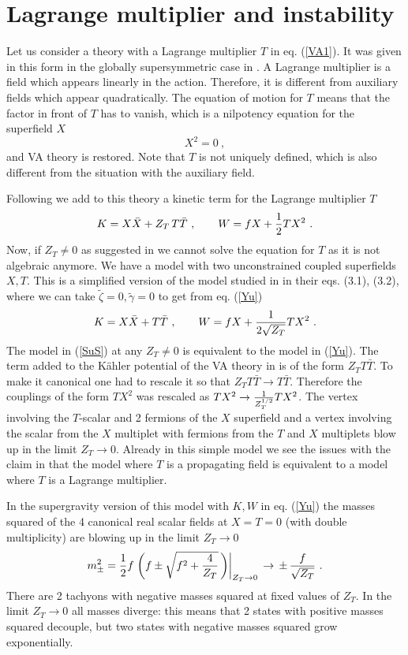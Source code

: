 \documentclass[11pt]{article}
\newcommand{\be}{\begin{equation}}
\newcommand{\ee}{\end{equation}}
\def\K{K{\"a}hler }
\newcommand{\rf}[1]{(\ref{#1})}
\def\be{\begin{equation}}
\def\ee{\end{equation}}
\newcommand{\lp}{\left(}
\newcommand{\rp}{\right)}
\begin{document}
\section{Lagrange multiplier and instability}\label{sec: LM}

Let us consider a theory with a Lagrange multiplier $T$ in  eq. \rf{VA1}. It was given in this form in the globally supersymmetric case in \cite{Komargodski:2009rz}. A Lagrange multiplier is a field which appears linearly in the action. Therefore, it is different from auxiliary fields which appear quadratically. The equation of motion for $T$ means that the factor in front of $T$ has to vanish, which is a nilpotency equation for the superfield $X$
\be
X^2=0 \ ,
\ee
and VA theory is restored. Note that  $T$ is not uniquely defined, which is also different from the situation with the auxiliary field. 

Following \cite{DallAgata:2022abm} we add to this theory a kinetic term for the Lagrange multiplier $T$  
\be
K= X\bar X + Z_T \, T\bar T\ ,  \qquad W= fX + {1\over 2}TX^2 \ .
\label{Yu} \ee
Now,  if $Z_T \neq 0$ as suggested in \cite{DallAgata:2022abm} we cannot solve the equation for $T$ as it is not algebraic anymore. We have a model with two unconstrained coupled superfields $X, T$. This is a simplified version of the model studied in \cite{DallAgata:2022abm} in their eqs. (3.1), (3.2), where we can take $ \tilde \zeta=0, \tilde \gamma=0$ to get from eq. \rf{Yu}
\be
K=  X {\bar X} +    T  {\bar T}  \ , \qquad 
W= f  X + {1\over 2 \sqrt {Z_T} }  T  X^2 \ .
\label{SuS}\ee
The model in  \rf{SuS} at any $Z_T \neq 0$ is equivalent to the model in \rf{Yu}.
The  term added to the \K potential of the VA theory in \cite{DallAgata:2022abm} is of the form $Z_T T \bar T$. To make it canonical one had to rescale it so that 
$Z_T T \bar T \to T\bar T$. Therefore the couplings of the form $TX^2$ was rescaled as $TX^2 \to {1\over Z_T^{1/2} } TX^2$. The vertex involving the $T$-scalar and 2 fermions of the $X$ superfield and a vertex involving the scalar from the $X$ multiplet with fermions from the $T$ and $X$ multiplets blow up in the limit $Z_T \rightarrow 0$. 
Already in this simple model we  see the issues with the claim in   \cite{DallAgata:2022abm} that the model where $T$ is a propagating field is equivalent to a model where $T$ is a Lagrange multiplier.

In the supergravity version of this model with $K, W$ in eq. \rf{Yu} the masses squared of the 4 canonical real scalar fields at $X=T=0$  (with double multiplicity) are blowing up in the limit $Z_T \to 0$
\be
m^2_{\pm} ={1\over 2} f 
\left. \lp f  \pm \sqrt{f^2 +{ 4\over Z_T } }\,\rp \right |_{Z_T \rightarrow 0}  \, \rightarrow \,  \pm \,  {f \over \sqrt {Z_T}} \ .
\label{mpm}\ee
There are 2 tachyons with negative masses squared at fixed values of $Z_T$. In the limit $Z_T \rightarrow 0$ all masses diverge: this means that 2 states with positive masses squared decouple, but two states with negative masses squared grow exponentially.
\end{document}
